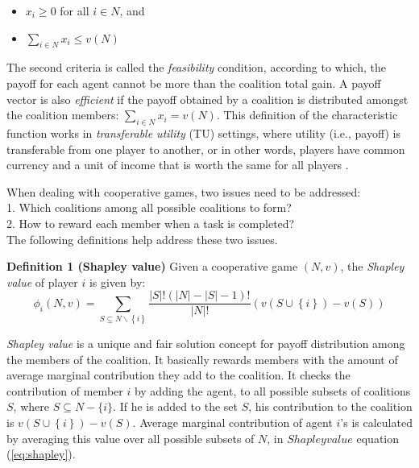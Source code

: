 \documentclass[10pt,journal,cspaper,compsoc]{IEEEtran}
\begin{document}
\begin{itemize}
    \item $x_i \geq 0$ for all $i \in N$, and
    \item $\sum_{i \in N} x_i \leq v(N)$
\end{itemize}

The second criteria is called the \emph{feasibility} condition,
according to which, the payoff for each agent cannot be more than
the coalition total gain. A payoff vector is also \emph{efficient}
if the payoff obtained by a coalition is distributed amongst the
coalition members: $\sum_{i \in N} x_i = v(N)$. This definition of
the characteristic function works in \emph{transferable utility}
(TU) settings, where utility (i.e., payoff) is transferable from
one player to another, or in other words, players have common
currency and a unit of income that is worth the same for all players
\cite{myerson1991game}.

When dealing with cooperative games, two issues need to be
addressed:\\ 1. Which coalitions among all possible coalitions to form? \\
2. How to reward each member when a task is completed?\\
%
The following definitions help address these two issues.


{\bf Definition 1 (Shapley value)} Given a cooperative game $(N,
v)$, the \emph{Shapley value} of player $i$ is given
by\cite{shapley_value}:
\begin{equation}\label{eq:shapley}
\phi_i(N,v) = \sum_{S \subseteq N \backslash \left\{i\right\} }
\frac{|S|! (|N|-|S|-1)!}{|N|!} (v(S \cup \left\{i\right\}) - v(S))
\end{equation}

\emph{Shapley value} is a unique and fair solution concept for
payoff distribution among the members of the coalition. It
basically rewards members with the amount of average marginal
contribution they add to the coalition. It checks the contribution
of member $i$ by adding the agent, to all possible subsets of
coalitions $S$, where $S \subseteq N-\{i\}$. If he is added to the
set $S$, his contribution to the coalition is $v(S \cup
\left\{i\right\}) - v(S)$. Average marginal contribution of agent
$i$'s is calculated by averaging this value over all possible
subsets of $N$, in $Shapley value$ equation (\ref{eq:shapley}).
\end{document}
